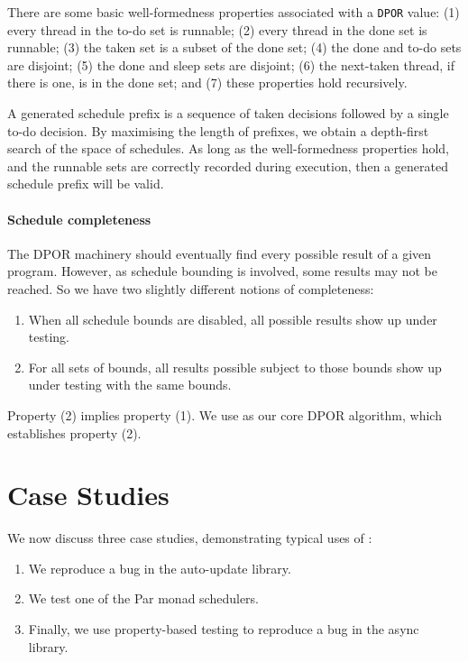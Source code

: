 There are some basic well-formedness properties associated with a
\verb|DPOR| value: (1) every thread in the to-do set is runnable; (2)
every thread in the done set is runnable; (3) the taken set is a
subset of the done set; (4) the done and to-do sets are disjoint; (5)
the done and sleep sets are disjoint; (6) the next-taken thread, if
there is one, is in the done set; and (7) these properties hold
recursively.

A generated schedule prefix is a sequence of taken decisions followed
by a single to-do decision.  By maximising the length of prefixes, we
obtain a depth-first search of the space of schedules.  As long as the
well-formedness properties hold, and the runnable sets are correctly
recorded during execution, then a generated schedule prefix will be
valid.

\paragraph{Schedule completeness}
The DPOR machinery should eventually find every possible result of a
given program.  However, as schedule bounding is involved, some
results may not be reached.  So we have two slightly different notions
of completeness:

\begin{enumerate}
\item When all schedule bounds are disabled, all possible results show
  up under testing.
\item For all sets of bounds, all results possible subject to those
  bounds show up under testing with the same bounds.
\end{enumerate}

Property (2) implies property (1).  We use \cite{coons2013} as our
core DPOR algorithm, which establishes property (2).

\section{Case Studies}
\label{sec:dejafu-casestudies}

We now discuss three case studies, demonstrating typical uses of
\dejafu{}:

\begin{enumerate}
\item We reproduce a bug in the auto-update\cite{auto_update} library.
\item We test one of the Par monad\cite{marlow2011} schedulers.
\item Finally, we use property-based testing to reproduce a bug in the
  async\cite{async} library.
\end{enumerate}

